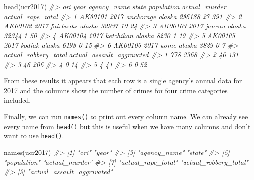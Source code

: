 \documentclass[
]{krantz}
\makeatletter
\newenvironment{Shaded}{\begin{snugshade}}{\end{snugshade}}
\newcommand{\CommentTok}[1]{\textcolor[rgb]{0.37,0.37,0.37}{\textit{#1}}}
\newcommand{\FunctionTok}[1]{\textcolor[rgb]{0,0,0}{#1}}
\newcommand{\NormalTok}[1]{#1}
\newenvironment{kframe}{%
\medskip{}
\setlength{\fboxsep}{.8em}
 \def\at@end@of@kframe{}%
 \ifinner\ifhmode%
  \def\at@end@of@kframe{\end{minipage}}%
  \begin{minipage}{\columnwidth}%
 \fi\fi%
 \def\FrameCommand##1{\hskip\@totalleftmargin \hskip-\fboxsep
 \colorbox{shadecolor}{##1}\hskip-\fboxsep
     \hskip-\linewidth \hskip-\@totalleftmargin \hskip\columnwidth}%
 \MakeFramed {\advance\hsize-\width
   \@totalleftmargin\z@ \linewidth\hsize
   \@setminipage}}%
 {\par\unskip\endMakeFramed%
 \at@end@of@kframe}
\renewenvironment{Shaded}{\begin{kframe}}{\end{kframe}}
\makeatother
\begin{document}
\begin{Shaded}
\begin{Highlighting}[]
\FunctionTok{head}\NormalTok{(ucr2017)}
\CommentTok{\#\textgreater{}       ori year agency\_name  state population actual\_murder actual\_rape\_total}
\CommentTok{\#\textgreater{} 1 AK00101 2017   anchorage alaska     296188            27               391}
\CommentTok{\#\textgreater{} 2 AK00102 2017   fairbanks alaska      32937            10                24}
\CommentTok{\#\textgreater{} 3 AK00103 2017      juneau alaska      32344             1                50}
\CommentTok{\#\textgreater{} 4 AK00104 2017   ketchikan alaska       8230             1                19}
\CommentTok{\#\textgreater{} 5 AK00105 2017      kodiak alaska       6198             0                15}
\CommentTok{\#\textgreater{} 6 AK00106 2017        nome alaska       3829             0                 7}
\CommentTok{\#\textgreater{}   actual\_robbery\_total actual\_assault\_aggravated}
\CommentTok{\#\textgreater{} 1                  778                      2368}
\CommentTok{\#\textgreater{} 2                   40                       131}
\CommentTok{\#\textgreater{} 3                   46                       206}
\CommentTok{\#\textgreater{} 4                    0                        14}
\CommentTok{\#\textgreater{} 5                    4                        41}
\CommentTok{\#\textgreater{} 6                    0                        52}
\end{Highlighting}
\end{Shaded}

From these results it appears that each row is a single agency's annual data for 2017 and the columns show the number of crimes for four crime categories included.

Finally, we can run \texttt{names()} to print out every column name. We can already see every name from \texttt{head()} but this is useful when we have many columns and don't want to use \texttt{head()}.

\begin{Shaded}
\begin{Highlighting}[]
\FunctionTok{names}\NormalTok{(ucr2017)}
\CommentTok{\#\textgreater{} [1] "ori"                       "year"                     }
\CommentTok{\#\textgreater{} [3] "agency\_name"               "state"                    }
\CommentTok{\#\textgreater{} [5] "population"                "actual\_murder"            }
\CommentTok{\#\textgreater{} [7] "actual\_rape\_total"         "actual\_robbery\_total"     }
\CommentTok{\#\textgreater{} [9] "actual\_assault\_aggravated"}
\end{Highlighting}
\end{Shaded}
\end{document}
